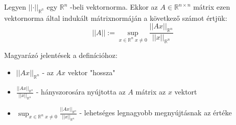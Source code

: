 \begin{definition}
    Legyen $\lvert \lvert \cdot \rvert \rvert _\mathbb{R^{n}}$ egy $\mathbb{R}^{n}$ -beli vektornorma. Ekkor az $A \in \mathbb{R}^{n \times n}$ mátrix ezen vektornorma által indukált mátrixnormáján a következő számot értjük: 
    \begin{equation*}
\lvert \lvert A \rvert  \rvert := \sup_{x \in \mathbb{R}^{n} \; x \neq 0} \frac{\lvert \lvert Ax \rvert  \rvert _{\mathbb{R}^{n}}}{\lvert \lvert x \rvert  \rvert _{\mathbb{R}^{n}}}
    \end{equation*}
\end{definition}
Magyarázó jelentések a definícióhoz:
\begin{itemize}
    \item $\lvert \lvert Ax \rvert \rvert_{\mathbb{R}^{n}}$ - az $Ax$ vektor "hossza"
    \item $\frac{\lvert \lvert Ax \rvert  \rvert _{\mathbb{R}^{n}}}{\lvert \lvert x \rvert  \rvert _{\mathbb{R}^{n}}}$ - hányszorosára nyújtotta az $A$ mátrix az $x$ vektort
    \item $\sup_{x \in \mathbb{R}^{n} \; x \neq 0} \frac{\lvert \lvert Ax \rvert  \rvert _{\mathbb{R}^{n}}}{\lvert \lvert x \rvert  \rvert _{\mathbb{R}^{n}}}$ - lehetséges legnagyobb megnyújtásnak az értéke
\end{itemize}

